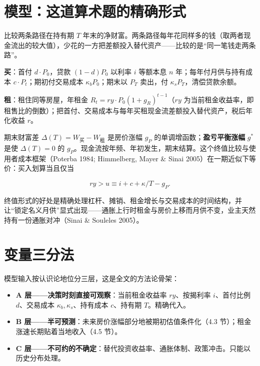 \documentclass[11pt,a4paper]{ctexart}
\begin{document}
\section{模型：这道算术题的精确形式}

比较两条路径在持有期 $T$ 年末的净财富。两条路径每年花同样多的钱（取两者现金流出的较大值），少花的一方把差额投入替代资产——比较的是``同一笔钱走两条路''。

\textbf{买}：首付 $d \cdot P_0$，贷款 $(1-d)P_0$ 以利率 $i$ 等额本息 $n$ 年；每年付月供与持有成本 $c \cdot P_t$；期初付交易成本 $\kappa_b P_0$；期末以 $P_T$ 卖出，付 $\kappa_s P_T$，清偿贷款余额。

\textbf{租}：租住同等房屋，年租金 $R_t = ry \cdot P_0 (1+g_R)^{t-1}$（$ry$ 为当前租金收益率，即租售比的倒数）；把首付、交易成本与每年买租现金流差额投入替代资产，税后年化收益 $r$。

期末财富差 $\Delta(T) = W_{\text{买}} - W_{\text{租}}$ 是房价涨幅 $g_P$ 的单调增函数；\textbf{盈亏平衡涨幅} $g^*$ 是使 $\Delta(T)=0$ 的 $g_P$。现金流按年频、年初发生，期末结算。这个终值比较与使用者成本框架（Poterba 1984; Himmelberg, Mayer \& Sinai 2005）在一期近似下等价：买入划算当且仅当

\begin{equation*}
ry > u \equiv i + c + \kappa/T - g_P.
\end{equation*}

终值形式的好处是精确处理杠杆、摊销、租金增长与交易成本的时间结构，并让``锁定名义月供''显式出现——通胀上行时租金与房价上移而月供不变，业主天然持有一份通胀对冲（Sinai \& Souleles 2005）。

\section{变量三分法}

模型输入按认识论地位分三层，这是全文的方法论骨架：

\begin{itemize}\itemsep0.2em
\item \textbf{A 层——决策时刻直接可观察}：当前租金收益率 $ry$、按揭利率 $i$、首付比例 $d$、交易成本 $\kappa_b, \kappa_s$、持有成本 $c$、持有期 $T$。精确代入。
\item \textbf{B 层——半可预测}：未来房价涨幅部分地被期初估值条件化（4.3 节）；租金涨速长期贴着当地收入（4.5 节）。
\item \textbf{C 层——不可约的不确定}：替代投资收益率、通胀体制、政策冲击。只能以历史分布处理。
\end{itemize}
\end{document}
